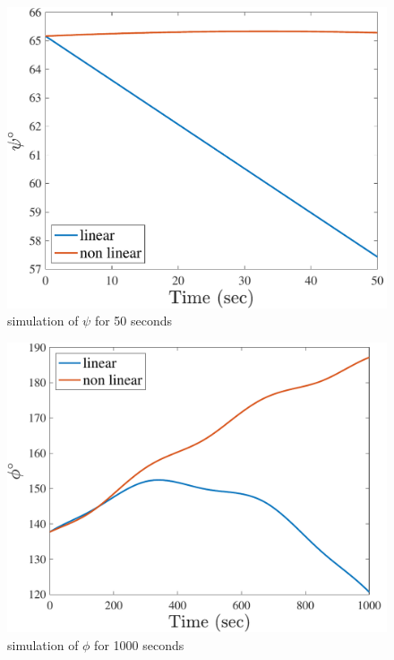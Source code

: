 \begin{figure}[H]
    \caption{simulation of $\psi$ for 50 seconds}
    \centering
    \includegraphics[width=12cm]{../Figure/Q2/psi_50}
\end{figure}

\begin{figure}[H]
    \caption{simulation of $\phi$ for 1000 seconds}
    \centering
    \includegraphics[width=12cm]{../Figure/Q2/phi_1000}
\end{figure}

